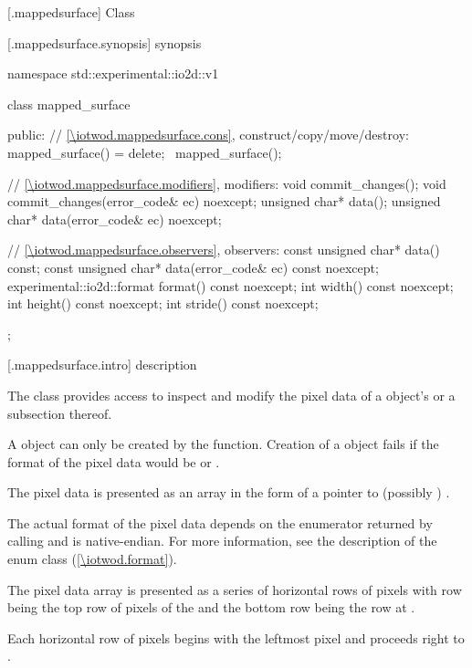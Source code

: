  [\iotwod.mappedsurface] {Class }

 [\iotwod.mappedsurface.synopsis] { synopsis}

\begin{codeblock}
namespace std::experimental::io2d::v1 {
  class mapped_surface {
  public:
    // \ref{\iotwod.mappedsurface.cons}, construct/copy/move/destroy:
    mapped_surface() = delete;
    ~mapped_surface();
    
    // \ref{\iotwod.mappedsurface.modifiers}, modifiers:
    void commit_changes();
    void commit_changes(error_code& ec) noexcept;
    unsigned char* data();
    unsigned char* data(error_code& ec) noexcept;
    
    // \ref{\iotwod.mappedsurface.observers}, observers:
    const unsigned char* data() const;
    const unsigned char* data(error_code& ec) const noexcept;
    experimental::io2d::format format() const noexcept;
    int width() const noexcept;
    int height() const noexcept;
    int stride() const noexcept;
  };
}
\end{codeblock}

 [\iotwod.mappedsurface.intro] { description}

\pnum
{}
The  class provides access to inspect and modify the pixel data of a  object's \underlyingsurface or a subsection thereof.

\pnum
A  object can only be created by the  function. Creation of a  object fails if the format of the pixel data would be  or .

\pnum
The pixel data is presented as an array in the form of a pointer to (possibly ) .

\pnum
The actual format of the pixel data depends on the  enumerator returned by calling  and is native-endian. For more information, see the description of the  enum class (\ref{\iotwod.format}).

\pnum
The pixel data array is presented as a series of horizontal rows of pixels with row  being the top row of pixels of the \underlyingsurface and the bottom row being the row at .

\pnum
Each horizontal row of pixels begins with the leftmost pixel and proceeds right to .

